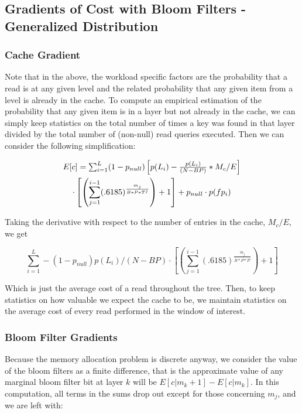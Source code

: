 \documentclass{sig-alternate-05-2015}
\begin{document}
\subsection{Gradients of Cost with Bloom Filters - Generalized Distribution}

\subsubsection{Cache Gradient}

Note that in the above, the workload specific factors are the probability that
a read is at any given level and the related probability that any given item
from a level is already in the cache. To compute an empirical estimation of the
probability that any given item is in a layer but not already in the cache, we
can simply keep statistics on the total number of times a key was found in that
layer divided by the total number of (non-null) read queries executed. Then we
can consider the following simplification:

\begin{multline}
$$E[c] = \sum_{i=1}^{L} (1-p_{null})\left[p(L_i) - \frac{p(L_i)}{(N - BP)} * M_c/E \right]\\ \cdot \left[ \left(\sum_{j=1}^{i-1} (.6185) ^  {\frac{m_j}{B*P*T^j}}\right) +1 \right] + p_{null} \cdot p(fp_i) $$
\end{multline}

Taking the derivative with respect to the number of entries in the cache,
$M_c/E$, we get 

$$
\sum_{i=1}^{L}  -(1-p_{null}) p(L_i)/(N - BP) \cdot \left[ \left(\sum_{j=1}^{i-1} (.6185) ^  {\frac{m_j}{B*P*T^j}}\right) +1 \right]
$$

Which is just the average cost of a read throughout the tree. Then, to keep
statistics on how valuable we expect the cache to be, we maintain statistics on
the average cost of every read performed in the window of interest.

\subsubsection{Bloom Filter Gradients}

Because the memory allocation problem is discrete anyway, we consider the value
of the bloom filters as a finite difference, that is the approximate value of
any marginal bloom filter bit at layer $k$ will be $E[c | m_k+1] - E[c | m_k]$.
In this computation, all terms in the sums drop out except for those concerning
$m_j$, and we are left with:
\end{document}
